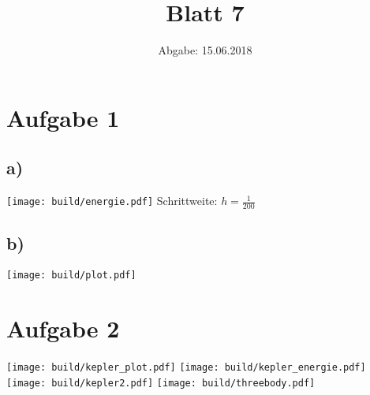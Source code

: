 

\title{Blatt 7}
\date{
  Abgabe: 15.06.2018
}



\parindent0mm
\section*{Aufgabe 1}
\subsection*{a)}
\texttt{[image: build/energie.pdf]}
Schrittweite: $h = \frac{1}{200}$
\subsection*{b)}
\texttt{[image: build/plot.pdf]}
\section*{Aufgabe 2}
\texttt{[image: build/kepler\_plot.pdf]}
\texttt{[image: build/kepler\_energie.pdf]}
\texttt{[image: build/kepler2.pdf]}
\texttt{[image: build/threebody.pdf]}


